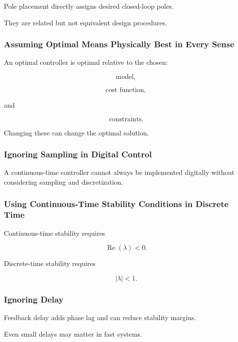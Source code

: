 Pole placement directly assigns desired closed-loop poles.

They are related but not equivalent design procedures.

\subsubsection{Assuming Optimal Means Physically Best in Every Sense}

An optimal controller is optimal relative to the chosen:

\[
\boxed{
\text{model},
}
\]

\[
\boxed{
\text{cost function},
}
\]

and

\[
\boxed{
\text{constraints}.
}
\]

Changing these can change the optimal solution.

\subsubsection{Ignoring Sampling in Digital Control}

A continuous-time controller cannot always be implemented digitally without
considering sampling and discretization.

\subsubsection{Using Continuous-Time Stability Conditions in Discrete Time}

Continuous-time stability requires

\[
\operatorname{Re}(\lambda)<0.
\]

Discrete-time stability requires

\[
|\lambda|<1.
\]

\subsubsection{Ignoring Delay}

Feedback delay adds phase lag and can reduce stability margins.

Even small delays may matter in fast systems.

